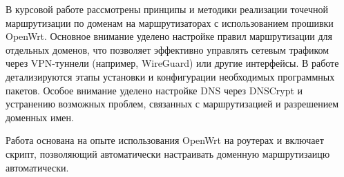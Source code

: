 \abstract %

В курсовой работе рассмотрены принципы и методики реализации точечной маршрутизации по доменам на маршрутизаторах с использованием прошивки OpenWrt. Основное внимание уделено настройке правил маршрутизации для отдельных доменов, что позволяет эффективно управлять сетевым трафиком через VPN-туннели (например, WireGuard) или другие интерфейсы. В работе детализируются этапы установки и конфигурации необходимых программных пакетов. Особое внимание уделено настройке DNS через DNSCrypt и устранению возможных проблем, связанных с маршрутизацией и разрешением доменных имен.

Работа основана на опыте использования OpenWrt на роутерах и включает
скрипт, позволяющий автоматически настраивать доменную маршрутизаицю автоматически.
